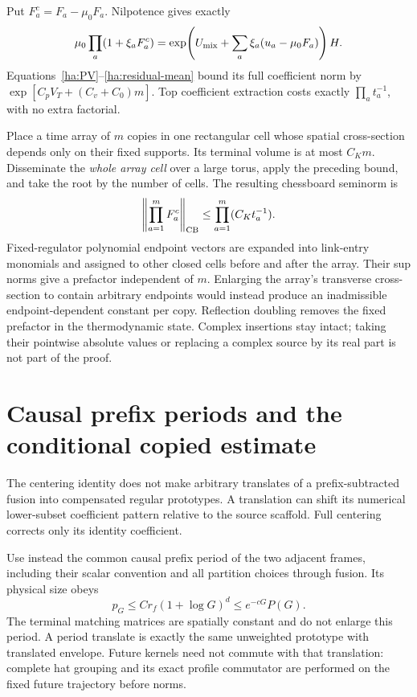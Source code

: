 Put $F_a^c=F_a-\mu_0F_a$.  Nilpotence gives exactly
\begin{equation}
 \mu_0\prod_a(1+\xi_aF_a^c)
 =\exp\!\left(U_{\rm mix}+\sum_a\xi_a(u_a-\mu_0F_a)\right)H.
 \label{ha:exact-centering}
\end{equation}
Equations~\eqref{ha:PV}--\eqref{ha:residual-mean} bound its full coefficient
norm by $\exp[C_pV_T+(C_v+C_0)m]$.  Top coefficient extraction costs
exactly $\prod_at_a^{-1}$, with no extra factorial.

Place a time array of $m$ copies in one rectangular cell whose spatial
cross-section depends only on their fixed supports.  Its terminal volume
is at most $C_Km$.  Disseminate the \emph{whole array cell} over a large
torus, apply the preceding bound, and take the root by the number of
cells.  The resulting chessboard seminorm is
\begin{equation}
 \left\|\prod_{a=1}^mF_a^c\right\|_{\rm CB}
                       \leq\prod_{a=1}^m(C_Kt_a^{-1}).
 \label{ha:array-bound}
\end{equation}
Fixed-regulator polynomial endpoint vectors are expanded into link-entry
monomials and assigned to other closed cells before and after the array.
Their sup norms give a prefactor independent of $m$.  Enlarging the
array's transverse cross-section to contain arbitrary endpoints would
instead produce an inadmissible endpoint-dependent constant per copy.
Reflection doubling removes the fixed prefactor in the thermodynamic
state.  Complex insertions stay intact; taking their pointwise absolute
values or replacing a complex source by its real part is not part of
the proof.

\section{Causal prefix periods and the conditional copied estimate}
\label{ha:copies}

The centering identity does not make arbitrary translates of a
prefix-subtracted fusion into compensated regular prototypes.  A
translation can shift its numerical lower-subset coefficient pattern
relative to the source scaffold.  Full centering corrects only its
identity coefficient.

Use instead the common causal prefix period of the two adjacent frames,
including their scalar convention and all partition choices through
fusion.  Its physical size obeys
\begin{equation}
 p_G\leq Cr_f(1+\log G)^d\leq e^{-cG}P(G).
 \label{ha:prefix-period}
\end{equation}
The terminal matching matrices are spatially constant and do not enlarge
this period.  A period translate is exactly the same unweighted prototype
with translated envelope.  Future kernels need not commute with that
translation: complete hat grouping and its exact profile commutator are
performed on the fixed future trajectory before norms.

